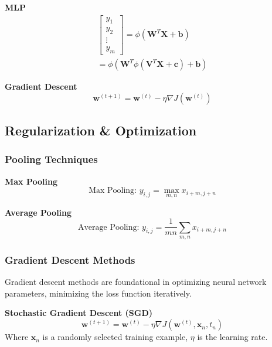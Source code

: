 \documentclass[8pt]{article}
\begin{document}
\begin{multicols}{2}
\textbf{MLP}
\begin{multline}
    \begin{bmatrix}
        y_1 \\
        y_2 \\
        \vdots \\
        y_m
    \end{bmatrix} = \phi(\mathbf{W}^T \mathbf{X} + \mathbf{b}) \\
    = \phi(\mathbf{W}^T \phi(\mathbf{V}^T \mathbf{X} + \mathbf{c}) + \mathbf{b})
\end{multline}

\textbf{Gradient Descent}
\begin{equation}
    \mathbf{w}^{(t+1)} = \mathbf{w}^{(t)} - \eta \nabla J(\mathbf{w}^{(t)})
\end{equation}

\subsection*{Regularization \& Optimization}

\subsubsection*{Pooling Techniques}

\textbf{Max Pooling}
\begin{equation}
    \text{Max Pooling: } y_{i,j} = \max_{m,n} x_{i+m, j+n}
\end{equation}

\textbf{Average Pooling}
\begin{equation}
    \text{Average Pooling: } y_{i,j} = \frac{1}{mn} \sum_{m,n} x_{i+m, j+n}
\end{equation}

\subsubsection*{Gradient Descent Methods}
Gradient descent methods are foundational in optimizing neural network parameters, minimizing the loss function iteratively.

\textbf{Stochastic Gradient Descent (SGD)}
\begin{equation}
    \mathbf{w}^{(t+1)} = \mathbf{w}^{(t)} - \eta \nabla J(\mathbf{w}^{(t)}, \mathbf{x}_n, t_n)
\end{equation}
Where $\mathbf{x}_n$ is a randomly selected training example, $\eta$ is the learning rate.


\end{multicols}
\end{document}
